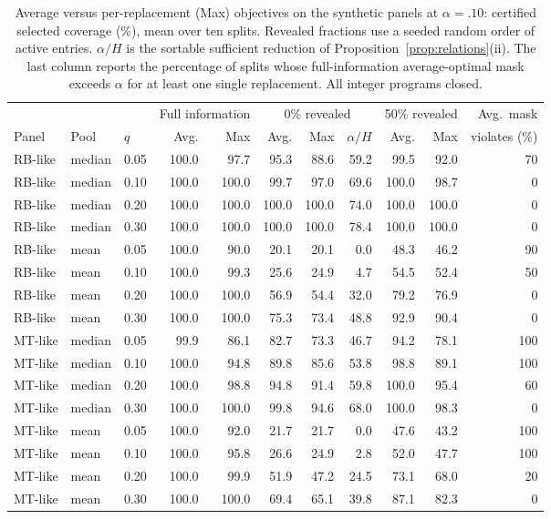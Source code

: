 \documentclass[11pt]{article}
\begin{document}
\begin{table}[t]
\centering\small
\setlength{\tabcolsep}{4pt}
\begin{tabular}{@{}lllrrrrrrrr@{}}
\toprule
& & & \multicolumn{2}{c}{Full information} & \multicolumn{3}{c}{0\% revealed} & \multicolumn{2}{c}{50\% revealed} & Avg.\ mask\\
\cmidrule(lr){4-5}\cmidrule(lr){6-8}\cmidrule(lr){9-10}
Panel & Pool & $q$ & Avg. & Max & Avg. & Max & $\alpha/H$ & Avg. & Max & violates (\%)\\
\midrule
RB-like & median & 0.05 & 100.0 & 97.7 & 95.3 & 88.6 & 59.2 & 99.5 & 92.0 & 70\\
RB-like & median & 0.10 & 100.0 & 100.0 & 99.7 & 97.0 & 69.6 & 100.0 & 98.7 & 0\\
RB-like & median & 0.20 & 100.0 & 100.0 & 100.0 & 100.0 & 74.0 & 100.0 & 100.0 & 0\\
RB-like & median & 0.30 & 100.0 & 100.0 & 100.0 & 100.0 & 78.4 & 100.0 & 100.0 & 0\\
RB-like & mean & 0.05 & 100.0 & 90.0 & 20.1 & 20.1 & 0.0 & 48.3 & 46.2 & 90\\
RB-like & mean & 0.10 & 100.0 & 99.3 & 25.6 & 24.9 & 4.7 & 54.5 & 52.4 & 50\\
RB-like & mean & 0.20 & 100.0 & 100.0 & 56.9 & 54.4 & 32.0 & 79.2 & 76.9 & 0\\
RB-like & mean & 0.30 & 100.0 & 100.0 & 75.3 & 73.4 & 48.8 & 92.9 & 90.4 & 0\\
MT-like & median & 0.05 & 99.9 & 86.1 & 82.7 & 73.3 & 46.7 & 94.2 & 78.1 & 100\\
MT-like & median & 0.10 & 100.0 & 94.8 & 89.8 & 85.6 & 53.8 & 98.8 & 89.1 & 100\\
MT-like & median & 0.20 & 100.0 & 98.8 & 94.8 & 91.4 & 59.8 & 100.0 & 95.4 & 60\\
MT-like & median & 0.30 & 100.0 & 100.0 & 99.8 & 94.6 & 68.0 & 100.0 & 98.3 & 0\\
MT-like & mean & 0.05 & 100.0 & 92.0 & 21.7 & 21.7 & 0.0 & 47.6 & 43.2 & 100\\
MT-like & mean & 0.10 & 100.0 & 95.8 & 26.6 & 24.9 & 2.8 & 52.0 & 47.7 & 100\\
MT-like & mean & 0.20 & 100.0 & 99.9 & 51.9 & 47.2 & 24.5 & 73.1 & 68.0 & 20\\
MT-like & mean & 0.30 & 100.0 & 100.0 & 69.4 & 65.1 & 39.8 & 87.1 & 82.3 & 0\\
\bottomrule
\end{tabular}
\caption{Average versus per-replacement (Max) objectives on the synthetic panels at $\alpha=.10$: certified selected coverage (\%), mean over ten splits. Revealed fractions use a seeded random order of active entries. $\alpha/H$ is the sortable sufficient reduction of Proposition~\ref{prop:relations}(ii). The last column reports the percentage of splits whose full-information average-optimal mask exceeds $\alpha$ for at least one single replacement. All integer programs closed.}
\label{tab:caps}
\end{table}
\end{document}
